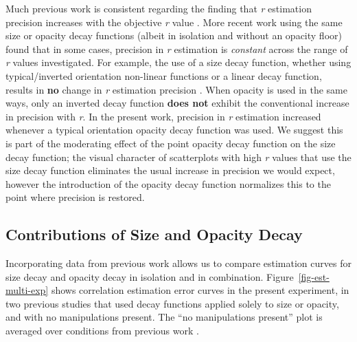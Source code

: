 \documentclass[manuscript, review, anonymous, screen]{acmart}
\begin{document}
Much previous work is consistent regarding the finding that \emph{r}
estimation precision increases with the objective \emph{r} value
\citep{rensink_2010, rensink_2012, rensink_2014, rensink_2017, doherty_2007}.
More recent work using the same size or opacity decay functions (albeit
in isolation and without an opacity floor)
\citep{strain_2023, strain_2023b} found that in some cases, precision in
\emph{r} estimation is \emph{constant} across the range of \emph{r}
values investigated. For example, the use of a size decay function,
whether using typical/inverted orientation non-linear functions or a
linear decay function, results in \textbf{no} change in \emph{r}
estimation precision \citep{strain_2023b}. When opacity is used in the
same ways, only an inverted decay function \textbf{does not} exhibit the
conventional increase in precision with \emph{r}. In the present work,
precision in \emph{r} estimation increased whenever a typical
orientation opacity decay function was used. We suggest this is part of
the moderating effect of the point opacity decay function on the size
decay function; the visual character of scatterplots with high \emph{r}
values that use the size decay function eliminates the usual increase in
precision we would expect, however the introduction of the opacity decay
function normalizes this to the point where precision is restored.

\hypertarget{contributions-of-size-and-opacity-decay}{%
\subsection{Contributions of Size and Opacity
Decay}\label{contributions-of-size-and-opacity-decay}}

Incorporating data from previous work \citep{strain_2023, strain_2023b}
allows us to compare estimation curves for size decay and opacity decay
in isolation and in combination. Figure~\ref{fig-est-multi-exp} shows
correlation estimation error curves in the present experiment, in two
previous studies that used decay functions applied solely to size or
opacity, and with no manipulations present. The ``no manipulations
present'' plot is averaged over conditions from previous work
\citep{strain_2023, strain_2023b}.
\end{document}
